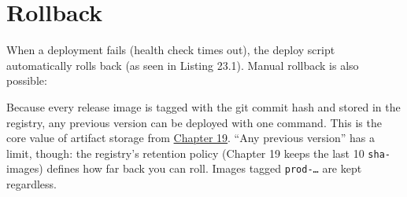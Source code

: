 \setcounter{section}{6}
\section{Rollback}\label{23-code-transfer:237-rollback}

When a deployment fails (health check times out), the deploy script automatically rolls back (as seen in Listing 23.1). Manual rollback is also possible:

\begin{codebox}[short]

\begin{Shaded}
\begin{Highlighting}[]
\end{Highlighting}
\end{Shaded}

\end{codebox}

\noindent{}Because every release image is tagged with the git commit hash and stored in the registry, any previous version can be deployed with one command. This is the core value of artifact storage from \hyperref[ch:19-artifact-storage]{Chapter 19}. ``Any previous version'' has a limit, though: the registry's retention policy (Chapter 19 keeps the last 10 \texttt{sha-} images) defines how far back you can roll. Images tagged \texttt{prod-…} are kept regardless.

